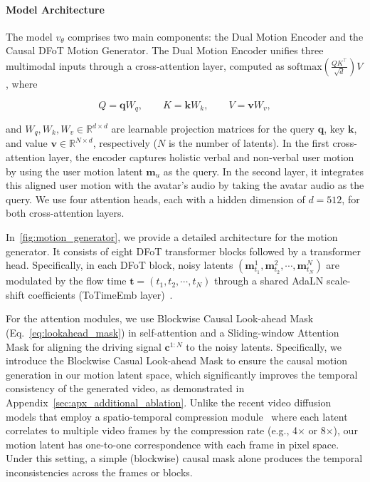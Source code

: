 \paragraph{Model Architecture}
The model $v_{\theta}$ comprises two main components: the Dual Motion Encoder and the Causal DFoT Motion Generator. The Dual Motion Encoder unifies three multimodal inputs through a cross-attention layer, computed as $\text{softmax}\left(\frac{QK^\top}{\sqrt{d}}\right)V$, where

\begin{equation}
    Q = \mathbf{q}W_q, \qquad
    K = \mathbf{k}W_k, \qquad
    V = \mathbf{v}W_v,
\end{equation}

and $W_q, W_k, W_v \in \mathbb{R}^{d \times d}$ are learnable projection matrices for the query $\mathbf{q}$, key $\mathbf{k}$, and value $\mathbf{v} \in \mathbb{R}^{N \times d}$, respectively ($N$ is the number of latents). In the first cross-attention layer, the encoder captures holistic verbal and non-verbal user motion by using the user motion latent $\mathbf{m}_u$ as the query. In the second layer, it integrates this aligned user motion with the avatar’s audio by taking the avatar audio as the query. We use four attention heads, each with a hidden dimension of $d = 512$, for both cross-attention layers.

In~\cref{fig:motion_generator}, we provide a detailed architecture for the motion generator. It consists of eight DFoT transformer blocks followed by a transformer head. Specifically, in each DFoT block, noisy latents $(\mathbf{m}_{t_1}^1, \mathbf{m}_{t_2}^2, \cdots, \mathbf{m}_{t_N}^N)$ are modulated by the flow time $\mathbf{t} = (t_1, t_2, \cdots, t_N)$ through a shared AdaLN scale-shift coefficients (ToTimeEmb layer)~\citep{pixart_a}. 

For the attention modules, we use Blockwise Causal Look-ahead Mask (Eq.~\eqref{eq:lookahead_mask}) in self-attention and a Sliding-window Attention Mask for aligning the driving signal $\mathbf{c}^{1:N}$ to the noisy latents. Specifically, we introduce the Blockwise Casual Look-ahead Mask to ensure the causal motion generation in our motion latent space, which significantly improves the temporal consistency of the generated video, as demonstrated in Appendix~\ref{sec:apx_additional_ablation}. Unlike the recent video diffusion models that employ a spatio-temporal compression module~\citep{causvid, self_forcing} where each latent correlates to multiple video frames by the compression rate (e.g., 4$\times$ or 8$\times$), our motion latent has one-to-one correspondence with each frame in pixel space. Under this setting, a simple (blockwise) causal mask alone produces the temporal inconsistencies across the frames or blocks. 

